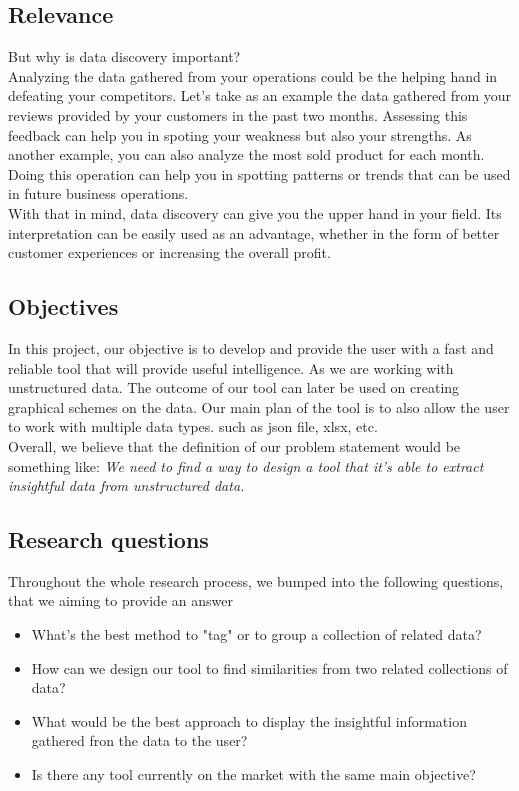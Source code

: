 \subsection{Relevance}
But why is data discovery important? 
\vspace{5mm} %
\\Analyzing the data gathered from your operations could be the helping hand in defeating your competitors. Let's take as an example the data gathered from your reviews provided by your customers in the past two months. Assessing this feedback can help you in spoting your weakness but also your strengths. As another example, you can also analyze the most sold product for each month. Doing this operation can help you in spotting patterns or trends that can be used in future business operations. 
\vspace{5mm} %
\\With that in mind, data discovery can give you the upper hand in your field. Its interpretation can be easily used as an advantage, whether in the form of better customer experiences or increasing the overall profit.

\subsection{Objectives}
In this project, our objective is to develop and provide the user with a fast and reliable tool that will provide useful intelligence. As we are working with unstructured data. The outcome of our tool can later be used on creating graphical schemes on the data. Our main plan of the tool is to also allow the user to work with multiple data types. such as json file, xlsx, etc.
\vspace{5mm} %
\\Overall, we believe that the definition of our problem statement would be something like: \textit{We need to find a way to design a tool that it's able to extract insightful data from unstructured data.}

\subsection{Research questions}
Throughout the whole research process, we bumped into the following questions, that we aiming to provide an answer 
\begin{itemize}
    \item What's the best method to "tag" or to group a collection of related data?
    \item How can we design our tool to find similarities from two related collections of data?
    \item What would be the best approach to display the insightful information gathered fron the data to the user?
    \item Is there any tool currently on the market with the same main objective?
\end{itemize}